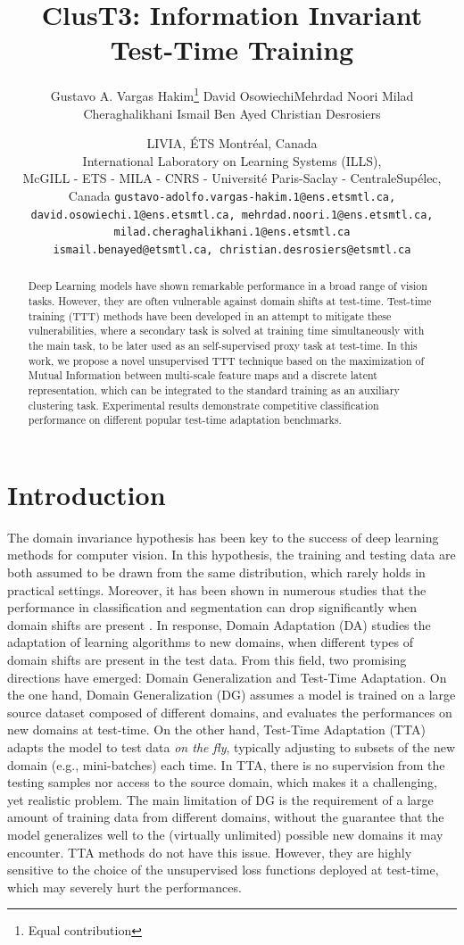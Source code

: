 \documentclass{article}
\title{ClusT3: Information Invariant Test-Time Training}
\date{} 					%
\author{Gustavo A. Vargas Hakim\thanks{Equal contribution} \And David Osowiechi\footnotemark[1] \And Mehrdad Noori \And Milad Cheraghalikhani \And Ismail Ben Ayed \And Christian Desrosiers}
\date{LIVIA, ÉTS Montréal, Canada \\ International Laboratory on Learning Systems (ILLS), \\ McGILL - ETS - MILA - CNRS - Université Paris-Saclay - CentraleSupélec, Canada \texttt{gustavo-adolfo.vargas-hakim.1@ens.etsmtl.ca, david.osowiechi.1@ens.etsmtl.ca,
mehrdad.noori.1@ens.etsmtl.ca, milad.cheraghalikhani.1@ens.etsmtl.ca\\
ismail.benayed@etsmtl.ca,  christian.desrosiers@etsmtl.ca}}
\begin{document}
\maketitle

\begin{abstract}
   Deep Learning models have shown remarkable performance in a broad range of vision tasks. However, they are often vulnerable against domain shifts at test-time. Test-time training (TTT) methods have been developed in an attempt to mitigate these vulnerabilities, where a secondary task is solved at training time simultaneously with the main task, to be later used as an self-supervised proxy task at test-time. In this work, we propose a novel unsupervised TTT technique based on the maximization of Mutual Information  between multi-scale feature maps and a discrete latent representation, which can be integrated to the standard training as an auxiliary clustering task. Experimental results demonstrate competitive classification performance on different popular test-time adaptation benchmarks.
\end{abstract}

\section{Introduction}
\label{sec:intro}

The domain invariance hypothesis has been key to the success of deep learning methods for computer vision. In this hypothesis, the training and testing data are both assumed to be drawn from the same distribution, which rarely holds in practical settings. Moreover, it has been shown in numerous studies that the performance in classification and segmentation can drop significantly when domain shifts are present \cite{Recht2018,visda}. In response, Domain Adaptation (DA) studies the adaptation of learning algorithms to new domains, when different types of domain shifts are present in the test data. From this field, two promising directions have emerged: Domain Generalization and Test-Time Adaptation. On the one hand, Domain Generalization (DG) \cite{dg1,dg2,dg3,dg4,dgsurvey} assumes a model is trained on a large source dataset composed of different domains, and evaluates the performances on new domains at test-time. On the other hand, Test-Time Adaptation (TTA) \cite{tent2021,shot2021,sita2021,lame2022}   adapts the model to test data \emph{on the fly}, typically adjusting to subsets of the new domain (e.g., mini-batches) each time. In TTA, there is no supervision from the testing samples nor access to the source domain, which makes it a challenging, yet realistic problem. The main limitation of DG is the requirement of a large amount of training data from different domains, without the guarantee that the model generalizes well to the (virtually unlimited) possible new domains it may encounter. TTA methods do not have this issue. However, they are highly sensitive to the choice of the unsupervised loss functions deployed at test-time, which may severely hurt the performances. 
\end{document}
